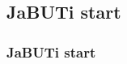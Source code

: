 \subsection{JaBUTi start}
\label{example:jabuti-start}

\begin{frame}[imacidie]
\frametitle{JaBUTi start}

\end{frame}
